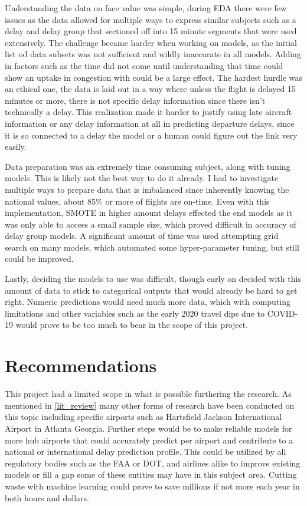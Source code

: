 \documentclass[a4paper,12pt]{article}
\begin{document}
Understanding the data on face value was simple, during EDA there were few issues as the data allowed for multiple ways to express similar subjects such
as a delay and delay group that sectioned off into 15 minute segments that were used extensively. The challenge became harder when working on models, as the initial list
od data subsets was not sufficient and wildly inaccurate in all models. Adding in factors such as the time did not come until understanding that time could show an uptake in congestion
with could be a large effect. The hardest hurdle was an ethical one, the data is laid out in a way where unless the flight is delayed 15 minutes or more, there is not specific delay information
since there isn't technically a delay. This realization made it harder to justify using late aircraft information or any delay information at all in predicting departure delays, since it is so connected
to a delay the model or a human could figure out the link very easily.

Data preparation was an extremely time consuming subject, along with tuning models. This is likely not the best way to do it already.
I had to investigate multiple ways to prepare data that is imbalanced since inherently knowing the national values, about 85\% or more of flights are on-time.
Even with this implementation, SMOTE in higher amount delays effected the end models as it was only able to access a small sample size, which proved difficult
in accuracy of delay group models. A significant amount of time was used attempting grid search on many models, which automated some hyper-parameter tuning, but still could be improved. 

Lastly, deciding the models to use was difficult, though early on decided with this amount of data to stick to categorical outputs that would already be hard to get right. Numeric predictions
would need much more data, which with computing limitations and other variables such as the early 2020 travel dips due to COVID-19 would prove to be too much to bear in the scope of this project.


\pagebreak

\section{Recommendations}

This project had a limited scope in what is possible furthering the research. As mentioned in \ref{lit_review} many other forms of research have been conducted on this topic
including specific airports such as Hartsfield Jackson International Airport in Atlanta Georgia. Further steps would be to make reliable models for more hub airports that could accurately predict
per airport and contribute to a national or international delay prediction profile. This could be utilized by all regulatory bodies such as the FAA or DOT, and airlines alike to improve existing models
or fill a gap some of these entities may have in this subject area. Cutting waste with machine learning could prove to save millions if not more each year in both hours and dollars.
\end{document}
